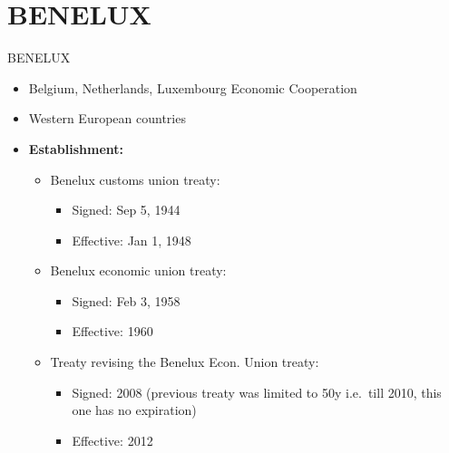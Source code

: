 \documentclass[
  12pt,
  ignorenonframetext,
  progressbar=frametitle]{beamer}
\providecommand{\tightlist}{%
  \setlength{\itemsep}{0pt}\setlength{\parskip}{0pt}}
\begin{document}
\section{BENELUX}
\begin{frame}[allowframebreaks]
{BENELUX}
\protect\hypertarget{benelux}{}
\begin{itemize}
\tightlist
\item
  Belgium, Netherlands, Luxembourg Economic Cooperation
\item
  Western European countries
\item
  \textbf{Establishment:}

  \begin{itemize}
  \tightlist
  \item
    Benelux customs union treaty:

    \begin{itemize}
    \tightlist
    \item
      Signed: Sep 5, 1944
    \item
      Effective: Jan 1, 1948
    \end{itemize}
  \item
    Benelux economic union treaty:

    \begin{itemize}
    \tightlist
    \item
      Signed: Feb 3, 1958
    \item
      Effective: 1960
    \end{itemize}
  \item
    Treaty revising the Benelux Econ. Union treaty:

    \begin{itemize}
    \tightlist
    \item
      Signed: 2008 (previous treaty was limited to 50y i.e.~till 2010,
      this one has no expiration)
    \item
      Effective: 2012
    \end{itemize}
  \end{itemize}
\end{itemize}
\end{frame}
\end{document}
